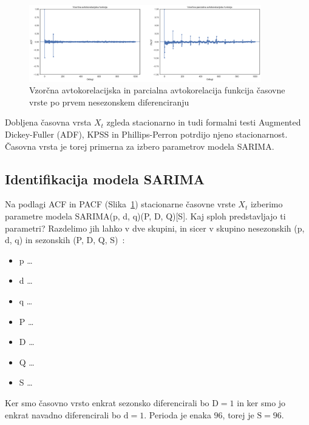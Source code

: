 \documentclass[a4paper, 11pt]{article}
\begin{document}
\begin{figure}[h!]
    \centering
    \caption{Vzorčna avtokorelacijska in parcialna avtokorelacija funkcija časovne vrste po prvem nesezonskem diferenciranju}\par\medskip
    \label{fig:ts_diff_2_acf_pacf}
    \includegraphics[width=0.9\textwidth]{ts_diff_2_acf_pacf.png}
\end{figure}

\noindent Dobljena časovna vrsta $X_t$ zgleda stacionarno in tudi formalni testi Augmented Dickey-Fuller (ADF), 
KPSS in Phillips-Perron potrdijo njeno stacionarnost. Časovna vrsta je torej primerna za izbero parametrov modela
SARIMA. 


\subsection{Identifikacija modela SARIMA}

\noindent Na podlagi ACF in PACF (Slika~\ref{fig:ts_diff_2_acf_pacf}) stacionarne časovne vrste $X_t$ izberimo parametre 
modela SARIMA(p, d, q)(P, D, Q)[S]. Kaj sploh predstavljajo ti parametri? Razdelimo jih lahko v dve skupini,
in sicer v skupino nesezonskih (p, d, q) in sezonskih (P, D, Q, S)~\cite{SARIMA_param}:

\begin{itemize}
    \item p \dots
    \item d \dots
    \item q \dots
    \item P \dots
    \item D \dots
    \item Q \dots
    \item S \dots
\end{itemize}

\noindent Ker smo časovno vrsto enkrat sezonsko diferencirali bo $\text{D} = 1$ in ker smo jo enkrat 
navadno diferencirali bo $\text{d} = 1$. Perioda je enaka $96$, torej je $\text{S} = 96$. \\
\end{document}
